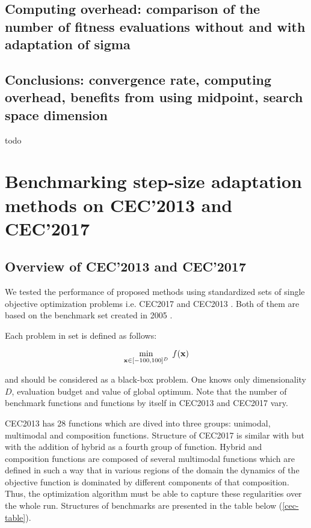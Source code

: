 \documentclass[runningheads,a4paper]{llncs}
\newcommand{\wec}[1]{
	{\bf{#1}} 
}
\begin{document}
\subsection{Computing overhead: comparison of the number of fitness evaluations without and with adaptation of sigma}



\subsection{Conclusions: convergence rate, computing overhead, benefits from using midpoint, search space dimension}
todo

\section{Benchmarking step-size adaptation methods on CEC'2013 and CEC'2017}
\subsection{Overview of CEC'2013 and CEC'2017}

We tested the performance of proposed methods using standardized sets of single objective optimization problems i.e. CEC2017 \cite{cec2017} and CEC2013 \cite{2013}. Both of them are based on the benchmark set created in 2005 \cite{cec2005}.

Each problem in set is defined as follows:

\begin{equation*}
  \min_{\wec{x} \in [-100, 100]^{D}}\; f(\wec{x})
\end{equation*}

and should be considered as a black-box problem. One knows only dimensionality $D$, evaluation budget and value of global optimum. Note that the number of benchmark functions and functions by itself in CEC2013 and CEC2017 vary. 

CEC2013 has 28 functions which are dived into three groups: unimodal, multimodal and composition functions.
Structure of CEC2017 is similar with but with the addition of hybrid as a fourth group of function. 
Hybrid and composition functions are composed of several multimodal functions which are defined in such a way that in various regions of the
domain the dynamics of the objective function is dominated by different components of that composition.
Thus, the optimization algorithm must be able to capture these regularities over the whole run.
Structures of benchmarks are presented in the table below (\ref{cec-table}).
\end{document}

